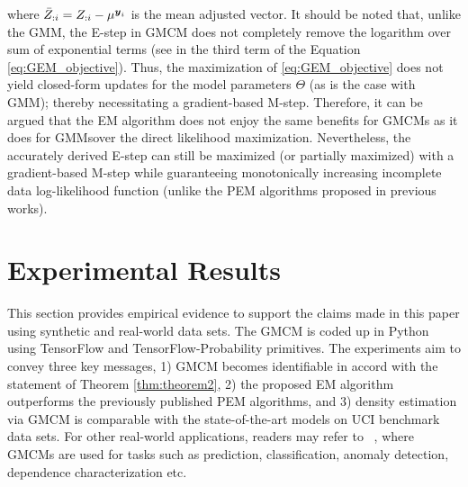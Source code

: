 \documentclass{article}
\theoremstyle{plain}
\theoremstyle{definition}
\theoremstyle{remark}
\begin{document}
where $\bar{Z}_{:{i}}=Z_{:i}-\mu^{\boldsymbol{y}_i}$ is the mean adjusted vector. It should be noted that, unlike the GMM, the E-step in GMCM does not completely remove the logarithm over sum of exponential terms (see in the third term of the Equation \ref{eq:GEM_objective}). Thus, the maximization of \eqref{eq:GEM_objective} does not yield closed-form updates for the model parameters $\Theta$ (as is the case with GMM); thereby necessitating a gradient-based M-step. Therefore, it can be argued that the EM algorithm does not enjoy the same benefits for GMCMs \textemdash as it does for GMMs\textemdash over the direct likelihood maximization. Nevertheless, the accurately derived E-step can still be maximized (or partially maximized) with a gradient-based M-step while guaranteeing monotonically increasing incomplete data log-likelihood function (unlike the PEM algorithms proposed in previous works).

\section{Experimental Results}\label{sec:Experimental}
This section provides empirical evidence to support the claims made in this paper using synthetic and real-world data sets. The GMCM is coded up in Python using TensorFlow and TensorFlow-Probability primitives.  The experiments aim to convey three key messages, 1) GMCM becomes identifiable in accord with the statement of Theorem \ref{thm:theorem2}, 2) the proposed EM algorithm outperforms the previously published  PEM algorithms, and 3) density estimation via GMCM is comparable with the state-of-the-art models on UCI benchmark data sets. For other real-world applications, readers may refer to ~\cite{Bilgrau2012quantification,Wang2014,Yu2013GMCMWindPred,Bayestehtashk2015}, where GMCMs are used for tasks such as prediction, classification, anomaly detection, dependence characterization etc.
\end{document}
